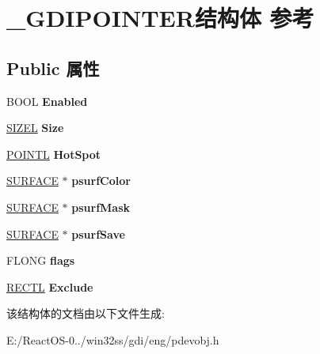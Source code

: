 \hypertarget{struct___g_d_i_p_o_i_n_t_e_r}{}\section{\+\_\+\+G\+D\+I\+P\+O\+I\+N\+T\+E\+R结构体 参考}
\label{struct___g_d_i_p_o_i_n_t_e_r}
\subsection*{Public 属性}
\begin{DoxyCompactItemize}
\item 
\mbox{\label{struct___g_d_i_p_o_i_n_t_e_r_a89028c0c6cb1c574a673ced955958969}} 
B\+O\+OL {\bfseries Enabled}
\item 
\mbox{\label{struct___g_d_i_p_o_i_n_t_e_r_af1305338c666e477391f575a6783fb80}} 
\hyperlink{structtag_s_i_z_e}{S\+I\+Z\+EL} {\bfseries Size}
\item 
\mbox{\label{struct___g_d_i_p_o_i_n_t_e_r_a435fda22908fa8fccc49145dc8600389}} 
\hyperlink{struct___p_o_i_n_t_l}{P\+O\+I\+N\+TL} {\bfseries Hot\+Spot}
\item 
\mbox{\label{struct___g_d_i_p_o_i_n_t_e_r_a440ac25c988268438a78fcf9404bdd47}} 
\hyperlink{struct___s_u_r_f_a_c_e}{S\+U\+R\+F\+A\+CE} $\ast$ {\bfseries psurf\+Color}
\item 
\mbox{\label{struct___g_d_i_p_o_i_n_t_e_r_ab83f4164e067c102934911b8de7c726e}} 
\hyperlink{struct___s_u_r_f_a_c_e}{S\+U\+R\+F\+A\+CE} $\ast$ {\bfseries psurf\+Mask}
\item 
\mbox{\label{struct___g_d_i_p_o_i_n_t_e_r_adc894700a193f81e7131d8c0f87fd6e3}} 
\hyperlink{struct___s_u_r_f_a_c_e}{S\+U\+R\+F\+A\+CE} $\ast$ {\bfseries psurf\+Save}
\item 
\mbox{\label{struct___g_d_i_p_o_i_n_t_e_r_a0626354666095f319aa17614a7bb62b4}} 
F\+L\+O\+NG {\bfseries flags}
\item 
\mbox{\label{struct___g_d_i_p_o_i_n_t_e_r_af6ab86718b14d3ecaaf5b97d5cb83e13}} 
\hyperlink{struct___r_e_c_t_l}{R\+E\+C\+TL} {\bfseries Exclude}
\end{DoxyCompactItemize}


该结构体的文档由以下文件生成\+:\begin{DoxyCompactItemize}
\item 
E\+:/\+React\+O\+S-\/0../win32ss/gdi/eng/pdevobj.\+h\end{DoxyCompactItemize}
